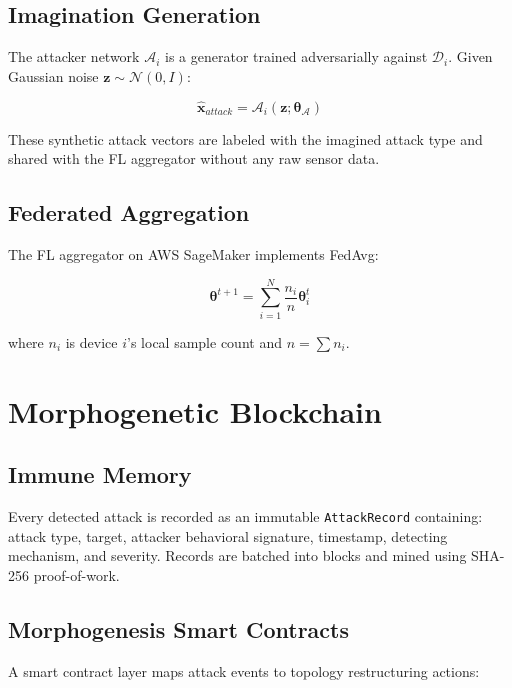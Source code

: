 \documentclass[journal]{IEEEtran}
\begin{document}
\subsection{Imagination Generation}
The attacker network $\mathcal{A}_i$ is a generator trained adversarially
against $\mathcal{D}_i$. Given Gaussian noise $\mathbf{z} \sim \mathcal{N}(0,I)$:

\begin{equation}
\hat{\mathbf{x}}_{attack} = \mathcal{A}_i(\mathbf{z}; \boldsymbol{\theta}_{\mathcal{A}})
\end{equation}

These synthetic attack vectors are labeled with the imagined attack type
and shared with the FL aggregator without any raw sensor data.

\subsection{Federated Aggregation}
The FL aggregator on AWS SageMaker implements FedAvg:

\begin{equation}
\boldsymbol{\theta}^{t+1} = \sum_{i=1}^{N} \frac{n_i}{n} \boldsymbol{\theta}_i^t
\end{equation}

where $n_i$ is device $i$'s local sample count and $n = \sum n_i$.


\section{Morphogenetic Blockchain}
\label{sec:mb}

\subsection{Immune Memory}
Every detected attack is recorded as an immutable \texttt{AttackRecord}
containing: attack type, target, attacker behavioral signature, timestamp,
detecting mechanism, and severity. Records are batched into blocks and
mined using SHA-256 proof-of-work.

\subsection{Morphogenesis Smart Contracts}
A smart contract layer maps attack events to topology restructuring actions:
\end{document}

